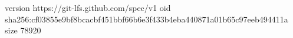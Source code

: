 version https://git-lfs.github.com/spec/v1
oid sha256:cf03855e9bf8bcacbf451bbf66b6e3f433b4eba440871a01b65c97eeb494411a
size 78920
